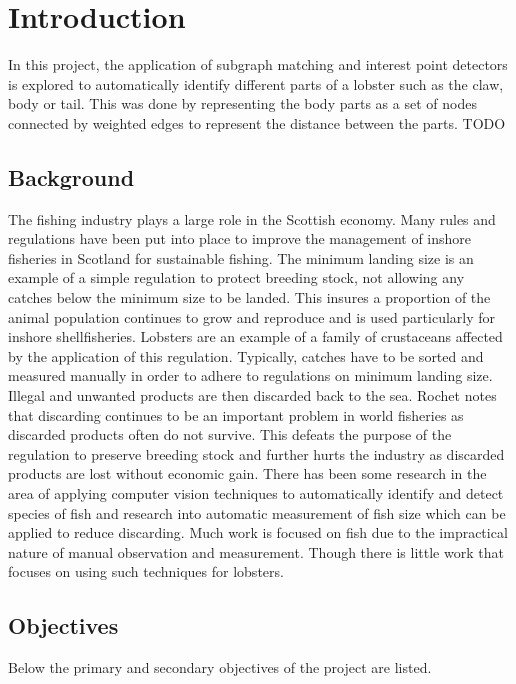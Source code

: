 
\section{Introduction}
In this project, the application of subgraph matching and interest point detectors is explored to automatically identify different parts of a lobster such as the claw, body or tail. This was done by representing the body parts as a set of nodes connected by weighted edges to represent the distance between the parts. 
\n
TODO


\subsection{Background}
The fishing industry plays a large role in the Scottish economy. Many rules and regulations have been put into place to improve the management of inshore fisheries in Scotland for sustainable fishing. The minimum landing size is an example of a simple regulation to protect breeding stock, not allowing any catches below the minimum size to be landed. This insures a proportion of the animal population continues to grow and reproduce \cite{masts-report} and is used particularly for inshore shellfisheries. Lobsters are an example of a family of crustaceans affected by the application of this regulation. 
\n
Typically, catches have to be sorted and measured manually in order to adhere to regulations on minimum landing size. Illegal and unwanted products are then discarded back to the sea. Rochet \cite{discard} notes that discarding continues to be an important problem in world fisheries as discarded products often do not survive. This defeats the purpose of the regulation to preserve breeding stock and further hurts the industry as discarded products are lost without economic gain. 
\n
There has been some research in the area of applying computer vision techniques to automatically identify and detect species of fish \cite{iobserver, fish-detection, fish-classification} and research into automatic measurement of fish size \cite{fish-size, fish-size2} which can be applied to reduce discarding. Much work is focused on fish due to the impractical nature of manual observation and measurement. Though there is little work that focuses on using such techniques for lobsters.

\subsection{Objectives}
Below the primary and secondary objectives of the project are listed.
